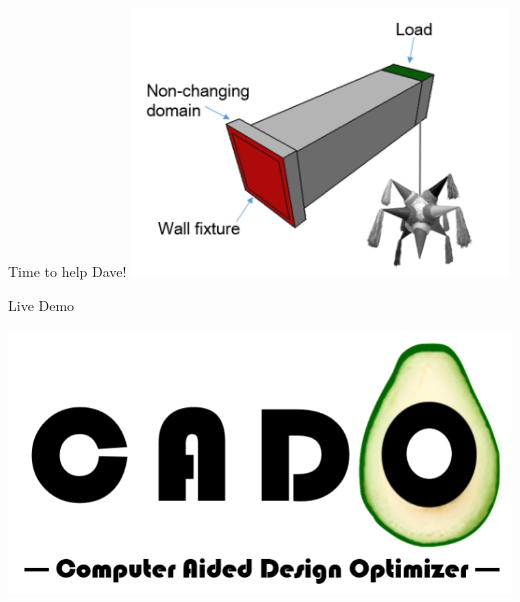 \begin{frame}{Time to help Dave!}
	\includegraphics[width=0.75\textwidth, center]{Pictures/FirstHalf/pinata_new}
\end{frame}

\begin{frame}{Live Demo}
\begin{center}
\includegraphics[scale=.5]{Pictures/FirstHalf/Intro_slide.pdf}
\end{center}
\end{frame}
